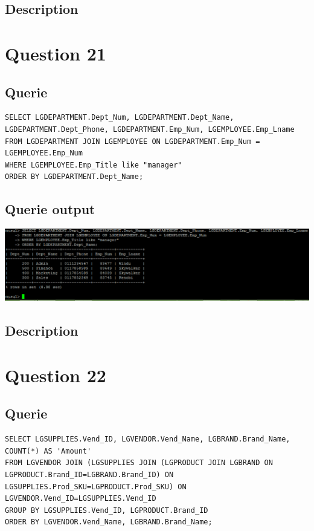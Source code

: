 \documentclass[a4paper,10pt]{article}
\begin{document}
\subsection{Description}\section*{Question 21}
 \subsection{Querie}
          \lstset{
            language=SQL,
            breaklines=true
            }
        \begin{lstlisting}[frame=single]
        SELECT LGDEPARTMENT.Dept_Num, LGDEPARTMENT.Dept_Name, LGDEPARTMENT.Dept_Phone, LGDEPARTMENT.Emp_Num, LGEMPLOYEE.Emp_Lname
FROM LGDEPARTMENT JOIN LGEMPLOYEE ON LGDEPARTMENT.Emp_Num = LGEMPLOYEE.Emp_Num
WHERE LGEMPLOYEE.Emp_Title like "manager"
ORDER BY LGDEPARTMENT.Dept_Name;

        \end{lstlisting}
\subsection{Querie output}
           \includegraphics{Queries/Question_21/Question_21_screenshot.PNG}
\subsection{Description}\section*{Question 22}
 \subsection{Querie}
          \lstset{
            language=SQL,
            breaklines=true
            }
        \begin{lstlisting}[frame=single]
        SELECT LGSUPPLIES.Vend_ID, LGVENDOR.Vend_Name, LGBRAND.Brand_Name, COUNT(*) AS 'Amount'
FROM LGVENDOR JOIN (LGSUPPLIES JOIN (LGPRODUCT JOIN LGBRAND ON LGPRODUCT.Brand_ID=LGBRAND.Brand_ID) ON LGSUPPLIES.Prod_SKU=LGPRODUCT.Prod_SKU) ON LGVENDOR.Vend_ID=LGSUPPLIES.Vend_ID
GROUP BY LGSUPPLIES.Vend_ID, LGPRODUCT.Brand_ID
ORDER BY LGVENDOR.Vend_Name, LGBRAND.Brand_Name;
        \end{lstlisting}
\end{document}
